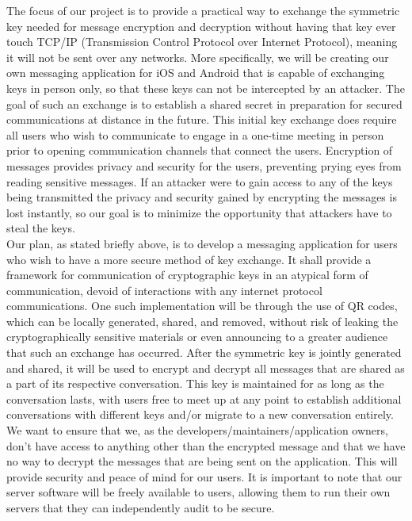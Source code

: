 \documentclass[11pt]{article}
\begin{document}
The focus of our project is to provide a practical way to exchange the symmetric key needed for message encryption and decryption without having that key ever touch TCP/IP (Transmission Control Protocol over Internet Protocol), meaning it will not be sent over any networks. More specifically, we will be creating our own messaging application for iOS and Android that is capable of exchanging keys in person only, so that these keys can not be intercepted by an attacker. The goal of such an exchange is to establish a shared secret in preparation for secured communications at distance in the future. This initial key exchange does require all users who wish to communicate to engage in a one-time meeting in person prior to opening communication channels that connect the users. Encryption of messages provides privacy and security for the users, preventing prying eyes from reading sensitive messages. If an attacker were to gain access to any of the keys being transmitted the privacy and security gained by encrypting the messages is lost instantly, so our goal is to minimize the opportunity that attackers have to steal the keys. \\

Our plan, as stated briefly above, is to develop a messaging application for users who wish to have a more secure method of key exchange. It shall provide a framework for communication of cryptographic keys in an atypical form of communication, devoid of interactions with any internet protocol communications. One such implementation will be through the use of QR codes, which can be locally generated, shared, and removed, without risk of leaking the cryptographically sensitive materials or even announcing to a greater audience that such an exchange has occurred. After the symmetric key is jointly generated and shared, it will be used to encrypt and decrypt all messages that are shared as a part of its respective conversation. This key is maintained for as long as the conversation lasts, with users free to meet up at any point to establish additional conversations with different keys and/or migrate to a new conversation entirely. We want to ensure that we, as the developers/maintainers/application owners, don’t have access to anything other than the encrypted message and that we have no way to decrypt the messages that are being sent on the application. This will provide security and peace of mind for our users. It is important to note that our server software will be freely available to users, allowing them to run their own servers that they can independently audit to be secure. 
\end{document}

